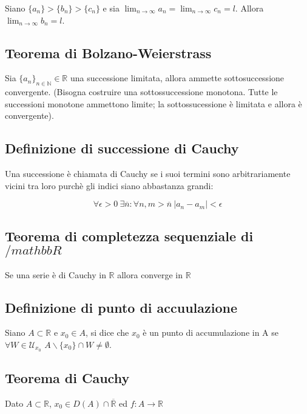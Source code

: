 \documentclass{article}
\begin{document}
Siano $\{a_n\}>\{b_n\}>\{c_n\}$ e sia $\lim_{n \to \infty}a_n=\lim_{n \to \infty}c_n=l$. Allora $\lim_{n \to \infty}b_n=l$.

\subsection{Teorema di Bolzano-Weierstrass}

Sia $\{a_n\}_{n \in \mathbb{N}} \in \mathbb{R}$ una successione limitata, allora ammette sottosuccessione convergente.
(Bisogna costruire una sottossuccessione monotona. Tutte le successioni monotone ammettono limite; la sottossucessione è limitata e allora è convergente).

\subsection{Definizione di successione di Cauchy}

Una successione è chiamata di Cauchy se i suoi termini sono arbitrariamente vicini tra loro purchè gli indici siano abbastanza grandi:

\begin{equation*}
	\forall \epsilon > 0 \ \exists \overline n: \forall n,m> \overline n \ |a_n-a_m|<\epsilon
\end{equation*}

\subsection{Teorema di completezza sequenziale di $ /mathbb{R}$}

Se una serie è di Cauchy in $\mathbb{R}$ allora converge in $\mathbb{R}$

\subsection{Definizione di punto di accuulazione}

Siano $A \subset \mathbb{R}$ e $x_0 \in A$, si dice che $x_0$ è un punto di accumulazione in A se $\forall W \in \mathcal{U}_{x_0}$ $A \backslash \{ x_0\} \cap W \neq \emptyset$.

\subsection{Teorema di Cauchy}

Dato $A \subset \mathbb{R}$, $x_0 \in D(A)\cap  \mathbb{\overline R}$ ed $f:A\rightarrow \mathbb{R}$
\end{document}
